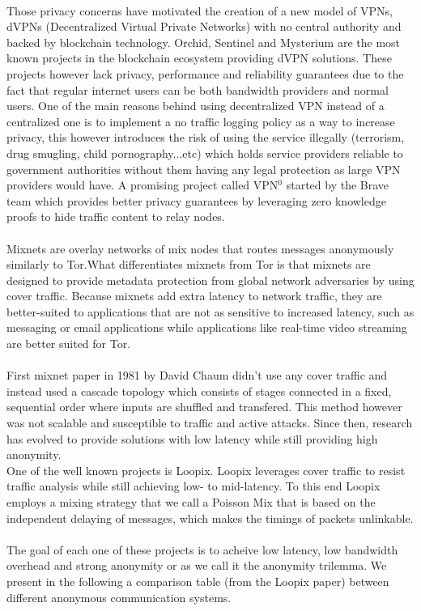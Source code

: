 \\Those privacy concerns have motivated the creation of a new model of VPNs, dVPNs (Decentralized Virtual Private Networks) with no central authority and backed by blockchain technology. Orchid, Sentinel and Mysterium are the most known projects in the blockchain ecosystem providing dVPN solutions. These projects however lack privacy, performance and reliability guarantees due to the fact that regular internet users can be both bandwidth providers and normal users. One of the main reasons behind using decentralized VPN instead of a centralized one is to implement a no traffic logging policy as a way to increase privacy, this however introduces the risk of using the service illegally (terrorism, drug smugling, child pornography...etc) which holds service providers reliable to government authorities without them having any legal protection as large VPN providers would have. A promising project called VPN$^0$ started by the Brave team which provides better privacy guarantees by leveraging zero knowledge proofs to hide traffic content to relay nodes. 
\\~\\Mixnets are overlay networks of mix nodes that routes messages anonymously similarly to Tor.What differentiates mixnets from Tor is that mixnets are designed to provide metadata protection from global network adversaries by using cover traffic. Because mixnets add extra latency to network traffic, they are better-suited to applications that are not as sensitive to increased latency, such as messaging or email applications while applications like real-time video streaming are better suited for Tor. 
\\~\\First mixnet paper in 1981 by David Chaum didn't use any cover traffic and instead used a cascade topology which consists of stages connected in a fixed, sequential order where inputs are shuffled and transfered. This method however was not scalable and susceptible to traffic and active attacks. Since then, research has evolved to provide solutions with low latency while still providing high anonymity.
\\ One of the well known projects is Loopix. Loopix leverages cover traffic to resist traffic analysis while still achieving low- to mid-latency. To this end Loopix employs a mixing strategy that we call a Poisson Mix that is based on the independent delaying of messages, which makes the timings of packets unlinkable.
\\~\\ The goal of each one of these projects is to acheive low latency, low bandwidth overhead and strong anonymity or as we call it the anonymity trilemma. We present in the following a comparison table (from the Loopix paper) between different anonymous communication systems.

